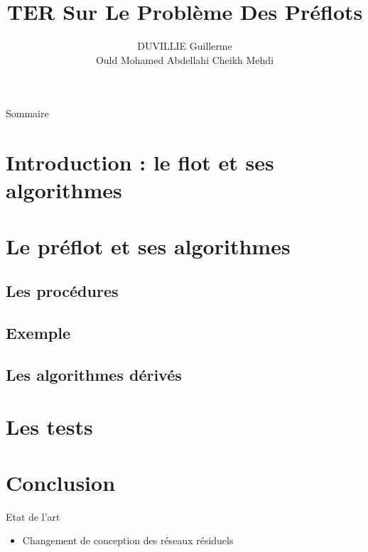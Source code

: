 \documentclass[hyperref={},
xcolor={dvipsnames,svgnames,table},10pt]{beamer}
\title{TER Sur Le Problème Des Préflots}
\author{DUVILLIE Guillerme \\ Ould Mohamed Abdellahi Cheikh Mehdi}
\institute{Université Montpellier2\\ Master1-Informatique\\ Spécialité-MOCA}
\begin{document}
\begin{frame}
	\titlepage 
\end{frame}


\begin{frame}{Sommaire}
  \tableofcontents
\end{frame} 

\section{Introduction : le flot et ses algorithmes}



\section{Le préflot et ses algorithmes}



\subsection{Les procédures}



\subsection{Exemple}


\subsection{Les algorithmes dérivés}


\section{Les tests}



\section{Conclusion}

\begin{frame}{Etat de l'art}
	\begin{itemize}
		\item Changement de conception des réseaux résiduels
	\end{itemize}
\end{frame}
\end{document}
